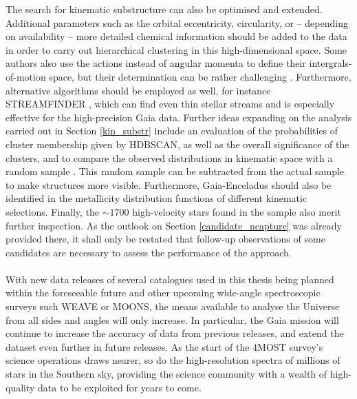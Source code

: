 \documentclass[a4paper,11pt]{article}
\begin{document}
%
The search for kinematic substructure can also be optimised and extended. Additional parameters such as the orbital eccentricity, circularity, or -- depending on availability -- more detailed chemical information should be added to the data in order to carry out hierarchical clustering in this high-dimensional space. Some authors also use the actions instead of angular momenta to define their intergrals-of-motion space, but their determination can be rather challenging \citep{mcmillan08,myeong18b}. Furthermore, alternative algorithms should be employed as well, for instance \textsc{STREAMFINDER} \citep{streamfinder}, which can find even thin stellar streams and is especially effective for the high-precision Gaia data. Further ideas expanding on the analysis carried out in Section \ref{kin_substr} include an evaluation of the probabilities of cluster membership given by \textsc{HDBSCAN}, as well as the overall significance of the clusters, and to compare the observed distributions in kinematic space with a random sample \citep[achieved by shuffling velocity components of the sample; see, e.g.,][]{helmi17}. This random sample can be subtracted from the actual sample to make structures more visible. Furthermore, Gaia-Enceladus should also be identified in the metallicity distribution functions of different kinematic selections. Finally, the ${\sim}1700$ high-velocity stars found in the sample also merit further inspection. As the outlook on Section \ref{candidate_ncapture} was already provided there, it shall only be restated that follow-up observations of some candidates are necessary to assess the performance of the approach.\\ \\
%
With new data releases of several catalogues used in this thesis being planned within the foreseeable future and other upcoming wide-angle spectroscopic surveys such WEAVE or MOONS, the means available to analyse the Universe from all sides and angles will only increase. In particular, the Gaia mission will continue to increase the accuracy of data from previous releases, and extend the dataset even further in future releases. As the start of the 4MOST survey's science operations draws nearer, so do the high-resolution spectra of millions of stars in the Southern sky, providing the science community with a wealth of high-quality data to be exploited for years to come.
%
%
%
%
%
\clearpage
\begin{multicols}{2}

{}
\end{multicols}
%
%
%
%
%
\newpage
\appendix
\end{document}
